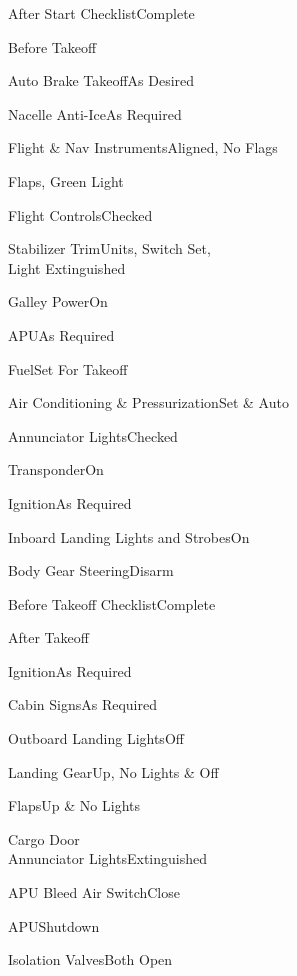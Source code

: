 \documentclass[sim-use, blue_items, halfpage]{checklist}
\begin{document}
\begin{continuedchecklist}
	\item{After Start Checklist}{Complete}
\end{continuedchecklist}

\begin{checklist}{Before Takeoff}
	\item{Auto Brake Takeoff}{As Desired}
	\item{Nacelle Anti-Ice}{As Required}
	\item{Flight \& Nav Instruments}{Aligned, No Flags}
	\item{Flaps}{\blank, \blank Green Light}
	\item{Flight Controls}{Checked}
	\item{Stabilizer Trim}{\blank Units, Switch Set,\\Light Extinguished}
	\item{Galley Power}{On}
	\item{APU}{As Required}
	\item{Fuel}{Set For Takeoff}
	\item{Air Conditioning \& Pressurization}{Set \& Auto}
	\item{Annunciator Lights}{Checked}
	\line
	\item{Transponder}{On}
	\item{Ignition}{As Required}
	\item{Inboard Landing Lights and Strobes}{On}
	\item{Body Gear Steering}{Disarm}
	\item{Before Takeoff Checklist}{Complete}
\end{checklist}

\begin{checklist}{After Takeoff}
	\item{Ignition}{As Required}
	\item{Cabin Signs}{As Required}
	\item{Outboard Landing Lights}{Off}
	\item{Landing Gear}{Up, No Lights \& Off}
	\item{Flaps}{Up \& No Lights}
	\item{Cargo Door\\Annunciator Lights}{Extinguished}
	 {
		\item{APU Bleed Air Switch}{Close}
		\item{APU}{Shutdown}
		\item{Isolation Valves}{Both Open}
	}
\end{checklist}
\end{document}

